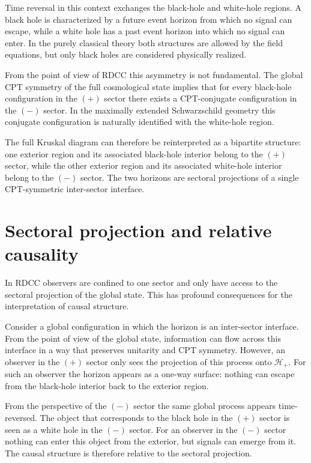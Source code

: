 \documentclass[11pt,a4paper]{article}
\begin{document}
Time reversal in this context exchanges the black-hole and white-hole regions. 
A black hole is characterized by a future event horizon from which no signal can escape, 
while a white hole has a past event horizon into which no signal can enter. 
In the purely classical theory both structures are allowed by the field equations, 
but only black holes are considered physically realized.

From the point of view of RDCC this asymmetry is not fundamental. 
The global CPT symmetry of the full cosmological state implies that for every black-hole configuration in the \((+)\) sector there exists a CPT-conjugate configuration in the \((-)\) sector. 
In the maximally extended Schwarzschild geometry this conjugate configuration is naturally identified with the white-hole region.

The full Kruskal diagram can therefore be reinterpreted as a bipartite structure: 
one exterior region and its associated black-hole interior belong to the \((+)\) sector, 
while the other exterior region and its associated white-hole interior belong to the \((-)\) sector. 
The two horizons are sectoral projections of a single CPT-symmetric inter-sector interface.

\section{Sectoral projection and relative causality}

In RDCC observers are confined to one sector and only have access to the sectoral projection 
of the global state. This has profound consequences for the interpretation of causal structure.

Consider a global configuration in which the horizon is an inter-sector interface. 
From the point of view of the global state, information can flow across this interface in a way 
that preserves unitarity and CPT symmetry. However, an observer in the \((+)\) sector only sees 
the projection of this process onto \(\mathcal{H}_{+}\). For such an observer the horizon appears as a 
one-way surface: nothing can escape from the black-hole interior back to the exterior region.

From the perspective of the \((-)\) sector the same global process appears time-reversed. 
The object that corresponds to the black hole in the \((+)\) sector is seen as a white hole in the 
\((-)\) sector. For an observer in the \((-)\) sector nothing can enter this object from the exterior, 
but signals can emerge from it. The causal structure is therefore relative to the sectoral projection.
\end{document}
